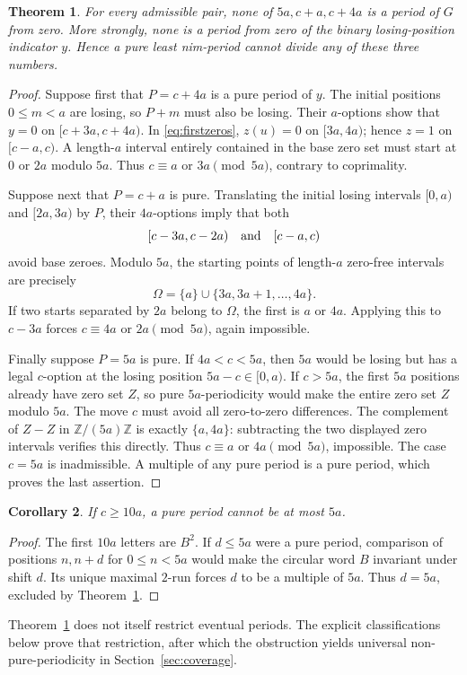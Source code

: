 \documentclass[11pt]{article}
\newtheorem{theorem}{Theorem}[section]
\newtheorem{corollary}[theorem]{Corollary}
\theoremstyle{remark}\newtheorem{remark}[theorem]{Remark}
\newcommand{\Z}{\mathbb Z}
\newcommand{\half}[2]{[#1,#2)}
\begin{document}
\begin{theorem}\label{thm:exclude}
For every admissible pair, none of $5a,c+a,c+4a$ is a period of $G$ from zero. More strongly, none is a period from zero of the binary losing-position indicator $y$. Hence a pure least nim-period cannot divide any of these three numbers.
\end{theorem}
\begin{proof}
Suppose first that $P=c+4a$ is a pure period of $y$. The initial positions $0\le m<a$ are losing, so $P+m$ must also be losing. Their $a$-options show that $y=0$ on $\half{c+3a}{c+4a}$. In \eqref{eq:firstzeros}, $z(u)=0$ on $\half{3a}{4a}$; hence $z=1$ on $\half{c-a}{c}$. A length-$a$ interval entirely contained in the base zero set must start at $0$ or $2a$ modulo $5a$. Thus $c\equiv a$ or $3a\pmod{5a}$, contrary to coprimality.

Suppose next that $P=c+a$ is pure. Translating the initial losing intervals $\half{0}{a}$ and $\half{2a}{3a}$ by $P$, their $4a$-options imply that both
\[\half{c-3a}{c-2a}\quad\hbox{and}\quad\half{c-a}{c}\]
avoid base zeroes. Modulo $5a$, the starting points of length-$a$ zero-free intervals are precisely
\[\Omega=\{a\}\cup\{3a,3a+1,\ldots,4a\}.\]
If two starts separated by $2a$ belong to $\Omega$, the first is $a$ or $4a$. Applying this to $c-3a$ forces $c\equiv4a$ or $2a\pmod{5a}$, again impossible.

Finally suppose $P=5a$ is pure. If $4a<c<5a$, then $5a$ would be losing but has a legal $c$-option at the losing position $5a-c\in\half{0}{a}$. If $c>5a$, the first $5a$ positions already have zero set $Z$, so pure $5a$-periodicity would make the entire zero set $Z$ modulo $5a$. The move $c$ must avoid all zero-to-zero differences. The complement of $Z-Z$ in $\Z/(5a)\Z$ is exactly $\{a,4a\}$: subtracting the two displayed zero intervals verifies this directly. Thus $c\equiv a$ or $4a\pmod{5a}$, impossible. The case $c=5a$ is inadmissible. A multiple of any pure period is a pure period, which proves the last assertion.
\end{proof}

\begin{corollary}\label{cor:short}
If $c\ge10a$, a pure period cannot be at most $5a$.
\end{corollary}
\begin{proof}
The first $10a$ letters are $B^2$. If $d\le5a$ were a pure period, comparison of positions $n,n+d$ for $0\le n<5a$ would make the circular word $B$ invariant under shift $d$. Its unique maximal $2$-run forces $d$ to be a multiple of $5a$. Thus $d=5a$, excluded by Theorem~\ref{thm:exclude}.
\end{proof}
Theorem~\ref{thm:exclude} does not itself restrict eventual periods. The explicit classifications below prove that restriction, after which the obstruction yields universal non-pure-periodicity in Section~\ref{sec:coverage}.
\end{document}
